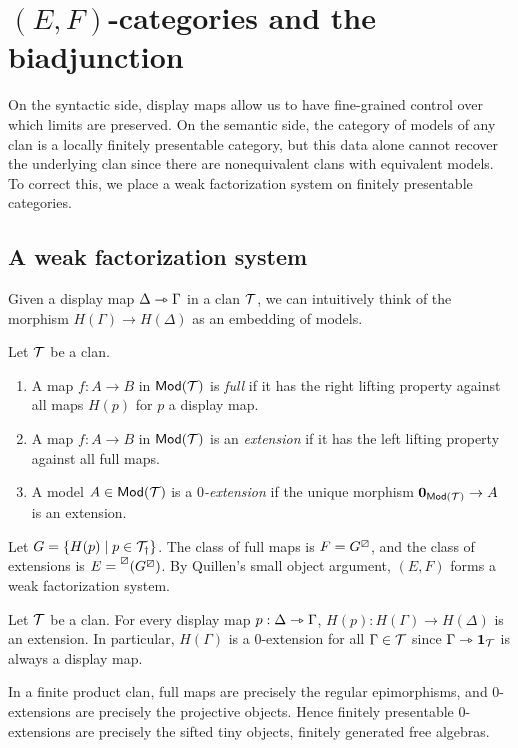 \documentclass[a4paper]{article}
\begin{document}
\section{$(E,F)$-categories and the biadjunction}

On the syntactic side, display maps allow us to have fine-grained control over which limits are preserved.
On the semantic side, the category of models of any clan is a locally finitely presentable category, but this data alone cannot recover the underlying clan since there are nonequivalent clans with equivalent models.
To correct this, we place a weak factorization system on finitely presentable categories.

\subsection{A weak factorization system}

Given a display map $\Delta \rightarrowtriangle \Gamma$ in a clan $\mathcal{T}$, we can intuitively think of the morphism $H(\Gamma) \to H(\Delta)$ as an embedding of models.
\begin{definition}
  Let $\mathcal{T}$ be a clan.
  \begin{enumerate}
  \item A map $f : A \to B$ in $\mathsf{Mod}(\mathcal{T})$ is \emph{full} if it has the right lifting property against all maps $H(p)$ for $p$ a display map.
  \item A map $f : A \to B$ in $\mathsf{Mod}(\mathcal{T})$ is an \emph{extension} if it has the left lifting property against all full maps.
  \item A model $A \in \mathsf{Mod}(\mathcal{T})$ is a \emph{$0$-extension} if the unique morphism $\mathbf{0}_{\mathsf{Mod}(\mathcal{T})} \to A$ is an extension.
  \end{enumerate}
\end{definition}

\begin{remark}
  Let $G = \{H(p) \mid p \in \mathcal{T}_{\dag}\}$.
  The class of full maps is $F = G^{\boxslash}$, and the class of extensions is $E = \prescript{\boxslash}{}{(G^{\boxslash})}$.
  By Quillen's small object argument, $(E,F)$ forms a weak factorization system.
\end{remark}

\begin{remark}
  Let $\mathcal{T}$ be a clan.
  For every display map $p : \Delta \rightarrowtriangle \Gamma$, $H(p) : H(\Gamma) \to H(\Delta)$ is an extension.
  In particular, $H(\Gamma)$ is a $0$-extension for all $\Gamma \in \mathcal{T}$ since $\Gamma \rightarrowtriangle \mathbf{1}_{\mathcal{T}}$ is always a display map.

  In a finite product clan, full maps are precisely the regular epimorphisms, and $0$-extensions are precisely the projective objects.
  Hence finitely presentable $0$-extensions are precisely the sifted tiny objects, \ie finitely generated free algebras.
\end{remark}
\end{document}
